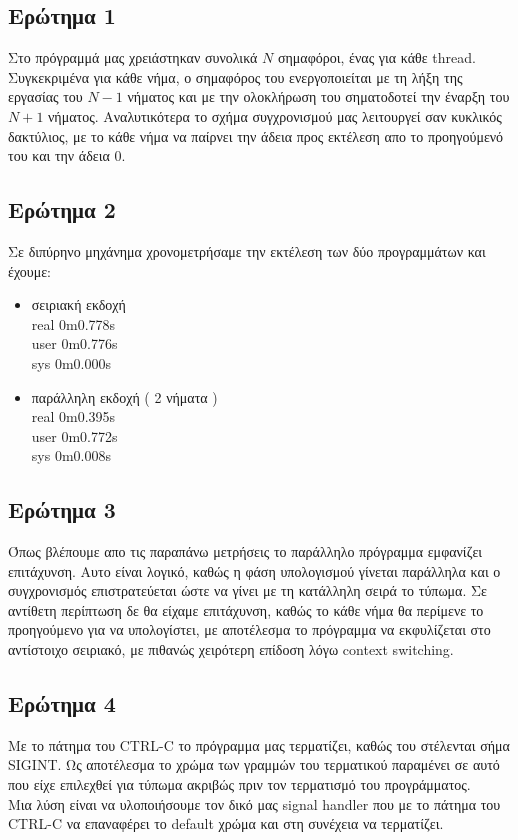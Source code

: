 \documentclass[12pt]{article}
\begin{document}
\subsection*{Ερώτημα 1}
Στο πρόγραμμά μας χρειάστηκαν συνολικά $N$ σημαφόροι, ένας για κάθε \textlatin{thread}. Συγκεκριμένα για κάθε νήμα, ο σημαφόρος του ενεργοποιείται με τη λήξη της εργασίας του $N-1$ νήματος και με την ολοκλήρωση του σηματοδοτεί την έναρξη του $N+1$ νήματος. Αναλυτικότερα το σχήμα συγχρονισμού μας λειτουργεί σαν κυκλικός δακτύλιος, με το κάθε νήμα να παίρνει την άδεια προς εκτέλεση απο το προηγούμενό του και την άδεια  $0$.


\subsection*{Ερώτημα 2}
Σε διπύρηνο μηχάνημα χρονομετρήσαμε την εκτέλεση των δύο προγραμμάτων και έχουμε: \\

\begin{itemize}

\item σειριακή εκδοχή \\ 
\textlatin{
real	0m0.778s   \\
user	0m0.776s   \\
sys	0m0.000s   \\
}

\item παράλληλη εκδοχή ( 2 νήματα ) \\
\textlatin{
real	0m0.395s \\
user	0m0.772s \\
sys	0m0.008s \\
}

\end{itemize}

\subsection*{Ερώτημα 3}
Όπως βλέπουμε απο τις παραπάνω μετρήσεις το παράλληλο πρόγραμμα εμφανίζει επιτάχυνση. Αυτο είναι λογικό, καθώς η φάση υπολογισμού γίνεται παράλληλα και ο συγχρονισμός επιστρατεύεται ώστε να γίνει με τη κατάλληλη σειρά το τύπωμα.  Σε αντίθετη περίπτωση δε θα είχαμε επιτάχυνση, καθώς το κάθε νήμα θα περίμενε το προηγούμενο για να υπολογίστει, με αποτέλεσμα το πρόγραμμα να εκφυλίζεται στο αντίστοιχο σειριακό, με πιθανώς χειρότερη επίδοση λόγω \textlatin{ context switching}.


\subsection*{Ερώτημα 4}
Με το πάτημα του \textlatin{CTRL-C} το πρόγραμμα μας τερματίζει, καθώς του στέλενται σήμα \textlatin{SIGINT}. Ως αποτέλεσμα το χρώμα των γραμμών του τερματικού παραμένει σε αυτό που είχε επιλεχθεί για τύπωμα ακριβώς πριν τον τερματισμό του προγράμματος. \\
Μια λύση είναι να υλοποιήσουμε τον δικό μας \textlatin{signal handler} που με το πάτημα του \textlatin{CTRL-C} να επαναφέρει το \textlatin{default} χρώμα και στη συνέχεια να τερματίζει.
\end{document}
